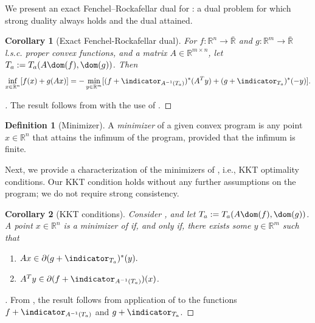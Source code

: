 \documentclass{article}
\theoremstyle{plain}
\newtheorem{corollary}{Corollary}[section]
\theoremstyle{definition}
\newtheorem{definition}{Definition}[section]
\theoremstyle{remark}
\begin{document}
We present an exact Fenchel--Rockafellar dual for :
a dual problem for which strong duality always holds and the dual attained.
\begin{corollary}[Exact Fenchel-Rockafellar dual]
\label{loc:exact_fenchel:rockafellar_dual.statement}
For $f:\mathbb{R}^n\to \bar{\mathbb{R}}$ and $g:\mathbb{R}^m \to \bar{\mathbb{R}}$ l.s.c. proper convex functions, and a matrix $A  \in \mathbb{R}^{m \times n}$,
let $T_a := T_a(A \dom(f), \dom(g))$. Then
\begin{equation*}
\inf_{x \in \mathbb{R}^n} [f(x)+ g(Ax)]=-\min_{y \in \mathbb{R}^m} [(f + \indicator_{A^{-1}(T_a)})^* (A^T y) + (g + \indicator_{T_a})^*(-y)].
\end{equation*}
\end{corollary}
\begin{proof}[\hypertarget{loc:exact_fenchel:rockafellar_dual.proof}Proof of \Cref{loc:exact_fenchel:rockafellar_dual.statement}]

The result follows from
with the use of \cite[Corollary 31.2.1]{rockafellarConvexAnalysis1970}.
\end{proof}
\begin{definition}[Minimizer]
\label{loc:minimizer.statement}
A \emph{minimizer} of a given convex program is any point $x \in \mathbb{R}^n$ that attains the infimum of the program, provided that the infimum is finite. 
\end{definition}
Next, we provide a characterization of the minimizers of 
, i.e.,
KKT optimality conditions. Our KKT condition 
holds without any
further assumptions on the program; we do not require strong consistency.
\begin{corollary}[KKT conditions]
\label{loc:optimality_condition_for_the_exact_fr_dual.statement}
Consider , and let $T_a := T_a(A \dom(f),  \dom(g))$.
A point $x \in \mathbb{R}^n$ is a minimizer of  if, and only if,
there exists some $y \in \mathbb{R}^m$ such that
\begin{enumerate}
\item $Ax \in \partial(g + \indicator_{T_a})^*(y).$
\item $A^Ty \in \partial(f + \indicator_{A^{-1}(T_a)})(x)$.
\end{enumerate}
\end{corollary}
\begin{proof}[\hypertarget{loc:optimality_condition_for_the_exact_fr_dual.proof}Proof of \Cref{loc:optimality_condition_for_the_exact_fr_dual.statement}]

From 
,
the result follows from application of \cite[Corollary 31.3.1]{rockafellarConvexAnalysis1970}
to the functions $f + \indicator_{A^{-1}(T_a)}$ and $g +
\indicator_{T_a}$.
\end{proof}
\end{document}
